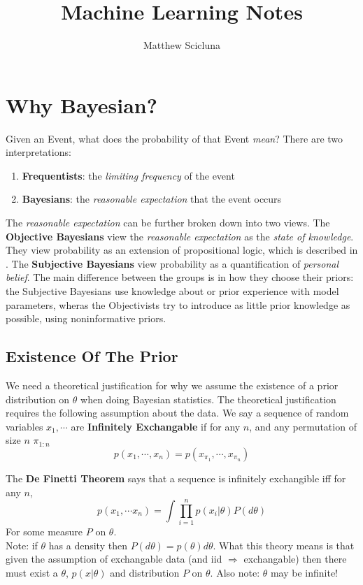 \documentclass[]{article}
\begin{document}
\title{Machine Learning Notes}
\author{Matthew Scicluna}
\maketitle

\section{Why Bayesian?}

Given an Event, what does the probability of that Event \emph{mean}? There are two interpretations:

\begin{enumerate}
	\item \textbf{Frequentists}: the \emph{limiting frequency} of the event
	\item \textbf{Bayesians}: the \emph{reasonable expectation} that the event occurs
\end{enumerate}

The \emph{reasonable expectation} can be further broken down into two views. The \textbf{Objective Bayesians} view the \emph{reasonable expectation} as the \emph{state of knowledge}. They view probability as an extension of propositional logic, which is described in \cite{jaynes}. The \textbf{Subjective Bayesians} view probability as a quantification of \emph{personal belief}. The main difference between the groups is in how they choose their priors: the Subjective Bayesians use knowledge about or prior experience with model parameters, wheras the Objectivists try to introduce as little prior knowledge as possible, using noninformative priors.

\subsection{Existence Of The Prior}
We need a theoretical justification for why we assume the existence of a prior distribution on \(\theta\) when doing Bayesian statistics. The theoretical justification requires the following assumption about the data. We say a sequence of random variables \(x_1, \cdots\) are \textbf{Infinitely Exchangable} if for any \(n\), and any permutation of size \(n\) \(\pi_{1:n}\)
\begin{equation}
p(x_1, \cdots, x_n) = p(x_{\pi_1}, \cdots, x_{\pi_n})
\end{equation}

The \textbf{De Finetti Theorem} says that a sequence is infinitely exchangible iff for any \(n\), 
\begin{equation}
p(x_1, \cdots x_n) = \int\prod_{i=1}^n p(x_i|\theta)P(d\theta)
\end{equation}
For some measure \(P\) on \(\theta\). 
\\
Note: if $\theta$ has a density then $P(d\theta) = p(\theta)d\theta$. What this theory means is that given the assumption of exchangable data (and iid $\Rightarrow$ exchangable) then there must exist a \(\theta\), \(p(x|\theta)\) and distribution \(P\) on \(\theta\). Also note: \(\theta\) may be infinite!
\end{document}
